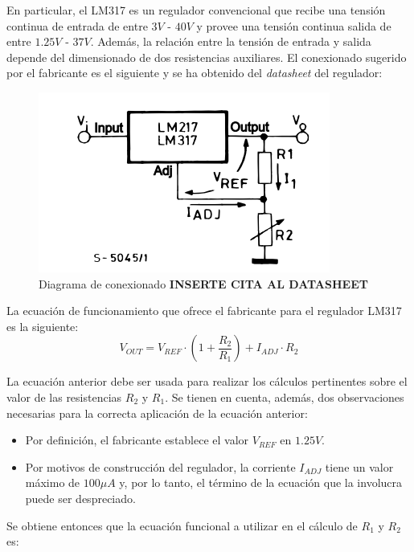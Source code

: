 
En particular, el LM317 es un regulador convencional que recibe una tensión continua de entrada de entre $3V$ - $40V$ y provee una tensión continua salida de entre $1.25V$ - $37V$. Además, la relación entre la tensión de entrada y salida depende del dimensionado de dos resistencias auxiliares. El conexionado sugerido por el fabricante es el siguiente y se ha obtenido del \textit{datasheet} del regulador:

\begin{figure}[H]
    \centering 
    \includegraphics[width=.6\linewidth]{pictures/LM317 conexionado.PNG}
    \caption{Diagrama de conexionado \textbf{INSERTE CITA AL DATASHEET}}
    \label{fig:CAMBIAR!!!!!!!!!!}
\end{figure}

La ecuación de funcionamiento que ofrece el fabricante para el regulador LM317 es la siguiente:
\begin{equation}
    V_{OUT} = V_{REF} \cdot \left( 1 + \frac{R_2}{R_1}\right) + I_{ADJ} \cdot R_2
\end{equation}

La ecuación anterior debe ser usada para realizar los cálculos pertinentes sobre el valor de las resistencias $R_2$ y $R_1$. Se tienen en cuenta, además, dos observaciones necesarias para la correcta aplicación de la ecuación anterior:
\begin{itemize}
    \item Por definición, el fabricante establece el valor $V_{REF}$ en $1.25V$.
    \item Por motivos de construcción del regulador, la corriente $I_{ADJ}$ tiene un valor máximo de $100 \mu A$ y, por lo tanto, el término de la ecuación que la involucra puede ser despreciado.
\end{itemize}

Se obtiene entonces que la ecuación funcional a utilizar en el cálculo de $R_1$ y $R_2$ es:

